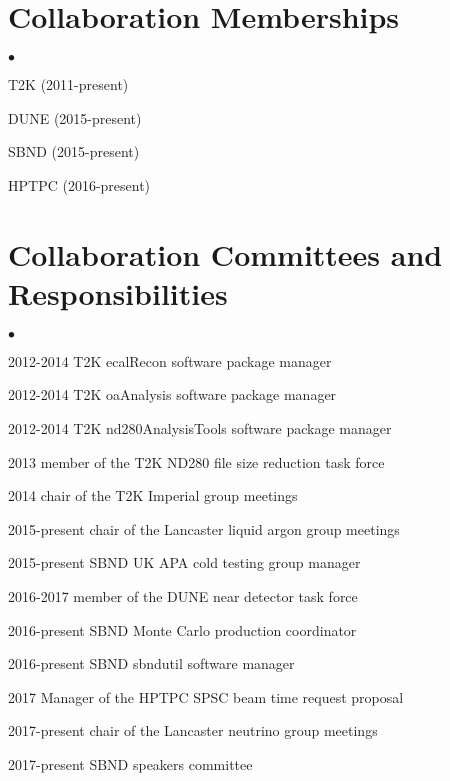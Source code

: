 \documentclass[margin,line]{res}
\newenvironment{list2}{
  \begin{list}{$\bullet$}{%
      \setlength{\itemsep}{0in}
      \setlength{\parsep}{0in} \setlength{\parskip}{0in}
      \setlength{\topsep}{0in} \setlength{\partopsep}{0in} 
      \setlength{\leftmargin}{0.2in}}}{\end{list}}
\begin{document}
\begin{resume}
 

 




\section{\sc Collaboration Memberships} 
\begin{list2}
\item T2K (2011-present)
\item DUNE (2015-present)
\item SBND (2015-present)
\item HPTPC (2016-present)
\end{list2}

\section{\sc Collaboration Committees and Responsibilities} 
\begin{list2}
\item 2012-2014 T2K ecalRecon software package manager
\item 2012-2014 T2K oaAnalysis software package manager
\item 2012-2014 T2K nd280AnalysisTools software package manager
\item 2013 member of the T2K ND280 file size reduction task force
\item 2014 chair of the T2K Imperial group meetings
\item 2015-present chair of the Lancaster liquid argon group meetings
\item 2015-present SBND UK APA cold testing group manager
\item 2016-2017 member of the DUNE near detector task force
\item 2016-present SBND Monte Carlo production coordinator
\item 2016-present SBND sbndutil software manager
\item 2017 Manager of the HPTPC SPSC beam time request proposal
\item 2017-present chair of the Lancaster neutrino group meetings
\item 2017-present SBND speakers committee 
\end{list2}


\end{resume}
\end{document}
